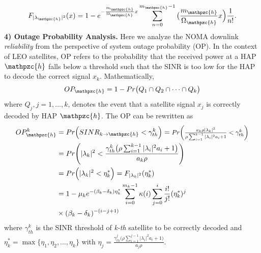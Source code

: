 \documentclass[letter,journal]{IEEEtran}
\newcommand*{\Resize}[2]{\resizebox{#1}{!}{$#2$}}%
\begin{document}
\begin{equation}\label{eqn_Fi}
  F_{|\lambda_\mathpzc{h}|^2} (x)=1-e^{-\frac{m_\mathpzc{h}}{\Omega_\mathpzc{h}}x} \sum_{n=0}^{m_\mathpzc{h}-1}\big(\frac{m_\mathpzc{h}}{\Omega_\mathpzc{h}}x\Big)  \frac{1}{n!}. 
\end{equation}
{\bf 4) Outage Probability Analysis.} Here we analyze the NOMA downlink \textit{reliability} from the perspective of system outage probability (OP). In the context of LEO satellites, OP refers to the probability that the received power at a HAP $\mathpzc{h}$ falls below a threshold such that the SINR is too low for the HAP to decode the correct signal $x_k$. Mathematically, %
\begin{equation}\label{OP_Sat}
    { OP_{\mathpzc{h}}=1-Pr\bigl( Q_1 \cap  Q_2 \cap\dots \cap Q_k \bigl)}
\end{equation}
where $Q_j, j=1,...,k$, denotes the event that a satellite signal $x_j$ is correctly decoded by HAP $\mathpzc{h}$. The OP can be rewritten as
\begin{align}
OP_{\mathpzc{h}}^{k}&=Pr \Big(SINR_{k\rightarrow \mathpzc{h}} < \gamma_{th}^k \Big) 
=\Resize{3.8cm}{Pr\bigg(\frac{a_k \rho  |{ {\lambda_{k}}}|^2}{\rho \sum_{i=1}^{k-1} | {\lambda_i}|^2a_i+1} < \gamma_{th}^k \bigg)} \notag \\
        &=Pr\Biggl(|{\lambda_{k}}|^2 < \frac{\gamma_{th}^k\bigl(\rho \sum_{i=1}^{k-1} | {\lambda_i}|^2a_i+1\bigl)}{a_k \rho }\Biggl) \notag \\
         &=Pr\Big(| {\lambda_{k}}|^2 < \eta^*_k\Big) = F_{| {\lambda_{k}}|^2 }(\eta^*_k) \notag \\ 
        &=1-\mu_k  e^{-(\beta_k-\delta_k)\eta^*_k} \sum_{i=0}^{m_k-1} \kappa(i)\sum_{j=0}^i \frac{i!}{j!} (\eta^*_k)^j\nonumber\\& \times(\beta_k-\delta_k )^{-(i-j+1)}   %
\end{align}
where $\gamma_{th}^k$ is the SINR threshold of \textit{k-th} satellite to be correctly decoded and $\eta^*_k=\max\{\eta_1,\eta_2,\dots,\eta_k\}$ with $\eta_j=\frac{\gamma_{th}^j\bigl(\rho \sum_{i=1}^{j-1} | {\lambda_i}|^2a_i+1\bigl)}{a_j\rho}$. %
\end{document}

